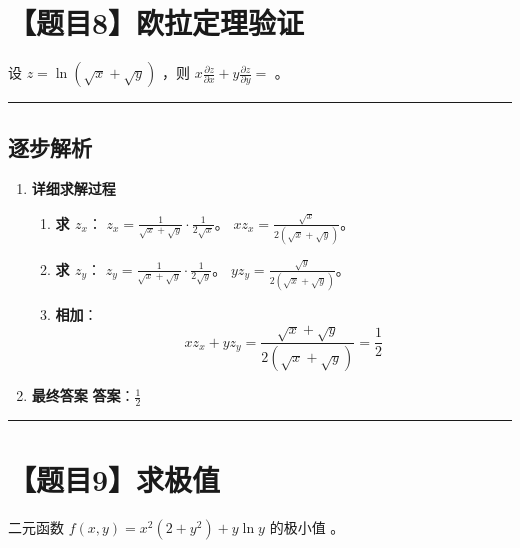 \documentclass[UTF8]{ctexart}
\newenvironment{redenv}{\color{red}}{}
\newenvironment{detailedanalysis}{%
    \color{red}
    \begin{enumerate}[label=\textbf{第\arabic*步：}, leftmargin=*, align=left, itemsep=1.5ex]
}{%
    \end{enumerate}
}
\newcommand{\problemrule}{\noindent\rule{\textwidth}{1.5pt}\vspace{-0.8em}}
\newcommand{\analysisrule}{\noindent\rule{\textwidth}{0.8pt}\vspace{-0.8em}}
\newcommand{\blank}[1]{\underline{\hspace{#1}}}
\begin{document}
\section*{【题目8】欧拉定理验证}
设 $ z = \ln(\sqrt{x} + \sqrt{y}) $ ，则 $ x \frac{\partial z}{\partial x} + y \frac{\partial z}{\partial y} = $ \blank{2cm}。

\begin{redenv}
\analysisrule
\subsection*{逐步解析}

\begin{detailedanalysis}
\item \textbf{详细求解过程}
\begin{enumerate}[label=(\arabic*)]
\item \textbf{求 $z_x$}：
$z_x = \frac{1}{\sqrt{x}+\sqrt{y}} \cdot \frac{1}{2\sqrt{x}}$。
$x z_x = \frac{\sqrt{x}}{2(\sqrt{x}+\sqrt{y})}$。
\item \textbf{求 $z_y$}：
$z_y = \frac{1}{\sqrt{x}+\sqrt{y}} \cdot \frac{1}{2\sqrt{y}}$。
$y z_y = \frac{\sqrt{y}}{2(\sqrt{x}+\sqrt{y})}$。
\item \textbf{相加}：
$$ x z_x + y z_y = \frac{\sqrt{x}+\sqrt{y}}{2(\sqrt{x}+\sqrt{y})} = \frac{1}{2} $$
\end{enumerate}

\item \textbf{最终答案}
\textbf{答案}：$ \frac{1}{2} $
\end{detailedanalysis}
\end{redenv}

\problemrule
\section*{【题目9】求极值}
二元函数 $ f(x,y)=x^{2}(2+y^{2})+y\ln y $ 的极小值 \blank{2cm}。
\end{document}
